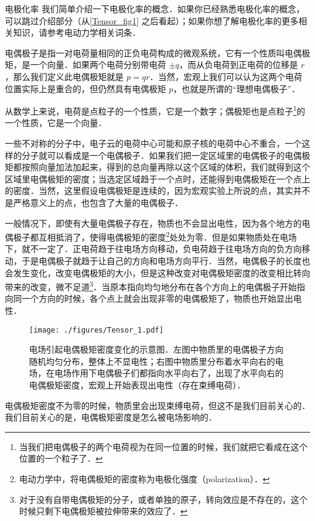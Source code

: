 \begin{example}{电极化率}
我们简单介绍一下电极化率的概念．如果你已经熟悉电极化率的概念，可以跳过介绍部分（从\autoref{Tensor_fig1} 之后看起）；如果你想了解电极化率的更多相关知识，请参考电动力学相关词条．

电偶极子是指一对电荷量相同的正负电荷构成的微观系统，它有一个性质叫电偶极矩，是一个向量．如果两个电荷分别带电荷 $\pm q$，而从负电荷到正电荷的位移是 ${r}$，那么我们定义此电偶极矩就是 ${p}=q{r}$．当然，宏观上我们可以认为这两个电荷位置实际上是重合的，但仍然具有电偶极矩 ${p}$，也就是所谓的“理想电偶极子”．

从数学上来说，电荷是点粒子的一个性质，它是一个数字；偶极矩也是点粒子\footnote{当我们把电偶极子的两个电荷视为在同一位置的时候，我们就把它看成在这个位置的一个粒子了．}的一个性质，它是一个向量．

一些不对称的分子中，电子云的电荷中心可能和原子核的电荷中心不重合，一个这样的分子就可以看成是一个电偶极子．如果我们把一定区域里的电偶极子的电偶极矩都按照向量加法加起来，得到的总向量再除以这个区域的体积，我们就得到这个区域里电偶极矩的密度；当选定区域趋于一个点时，还能得到电偶极矩在一个点上的密度．当然，这里假设电偶极矩是连续的，因为宏观实验上所说的点，其实并不是严格意义上的点，也包含了大量的电偶极子．

一般情况下，即使有大量电偶极子存在，物质也不会显出电性，因为各个地方的电偶极子都互相抵消了，使得电偶极矩的密度\footnote{电动力学中，将电偶极矩的密度称为电极化强度（polarization）．}处处为零．但是如果物质处在电场下，就不一定了．正电荷趋于往电场方向移动，负电荷趋于往电场方向的负方向移动，于是电偶极子就趋于让自己的方向和电场方向平行．当然，电偶极子的长度也会发生变化，改变电偶极矩的大小，但是这种改变对电偶极矩密度的改变相比转向带来的改变，微不足道\footnote{对于没有自带电偶极矩的分子，或者单独的原子，转向效应是不存在的，这个时候只剩下电偶极矩被拉伸带来的效应了．}．当原本指向均匀地分布在各个方向上的电偶极子开始指向同一个方向的时候，各个点上就会出现非零的电偶极矩了，物质也开始显出电性．

\begin{figure}[ht]
\centering
\texttt{[image: ./figures/Tensor\_1.pdf]}
\caption{电场引起电偶极矩密度变化的示意图．左图中物质里的电偶极子方向随机均匀分布，整体上不显电性；右图中物质里分布着水平向右的电场，在电场作用下电偶极子们都指向水平向右了，出现了水平向右的电偶极矩密度，宏观上开始表现出电性（存在束缚电荷）．} \label{Tensor_fig1}
\end{figure}

电偶极矩密度不为零的时候，物质里会出现束缚电荷，但这不是我们目前关心的．我们目前关心的是，电偶极矩密度是怎么被电场影响的．


\end{example}
